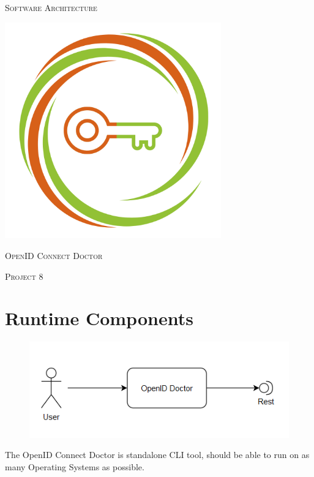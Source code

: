 \documentclass[12pt]{article}
\begin{document}
\begin{titlepage}
    \centering
    {\scshape\Huge Software Architecture \par}
    \vspace{1cm}
    \includegraphics[width=0.7\textwidth]{team-logo}\par\vspace{1cm}
    {\scshape\huge OpenID Connect Doctor \par}
    {\scshape\Large Project 8 \par}
\end{titlepage}

\section{Runtime Components}
\begin{figure}[!h]
    \centering
    \includegraphics[width=\textwidth]{runtime_comp}
\end{figure}

{\large The OpenID Connect Doctor is standalone CLI tool, should be able to run on as many Operating Systems as possible. }

\newpage
\end{document}
